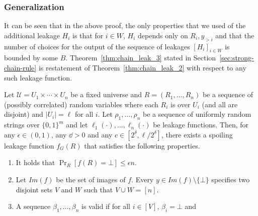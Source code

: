 \subsubsection{Generalization} 
 \label{sec:generalization}
It can be seen that in the above proof, the only
properties that we used of the additional leakage $H_i$
is that for $i \in W$, $H_i$ depends only on $R_i, y_{>i}$
and that the number of choices for the output of the sequence of leakages $[H_i]_{i \in W}$ is bounded
by some $B$. Theorem~\ref{thm:chain_leak_3} stated in Section~\ref{sec:strong-chain-rule} is restatement of Theorem~\ref{thm:chain_leak_2} with respect to any such leakage function.
%
\iffalse
\begin{theorem} \label{thm:chain_leak_3}  
Let $\mathcal{U} = U_1 \times \cdots \times U_n$ be a fixed universe
and $R = (R_1,\dots,R_n)$ be a sequence of (possibly correlated) random variables where each $R_i$ is over $U_i$ (and all are disjoint) and $|U_i| = \ell$ for all $i$.
Let $\rho_1, \ldots, \rho_n$ be a sequence of uniformly
random strings over $\{0,1\}^m$
and
let $\ell_1(\cdot), \ldots, \ell_n(\cdot)$ be leakage functions.
Then, for any $\epsilon \in (0, 1)$, 
any $\dd > 0$ and any $c \in [2^\delta, \ell/2^\delta]$, 
there exists a spoiling 
leakage function $f_G(R)$ that satisfies the following properties. 
\begin{enumerate}

    \item It holds that $\Pr_{R}[f(R) = \bot] \leq \epsilon n$.
    \item 
    Let $Im(f)$ be the set of images of $f$. 
    Every $y \in Im(f) \setminus \{\bot\}$ specifies two disjoint sets $V$ and $W$ such that $V \cup W = [n]$.
    \item A sequence $\beta_1, \ldots, \beta_n$ is valid if 
    for all $i \in [V]$, $\beta_i = \bot$ and 

\end{enumerate}
\end{theorem}

